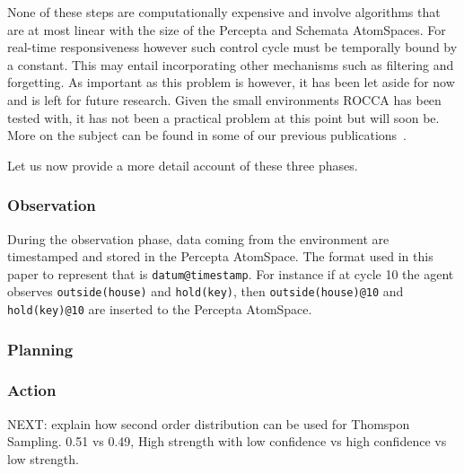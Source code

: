 \documentclass[runningheads]{llncs}
\begin{document}
None of these steps are computationally expensive and involve
algorithms that are at most linear with the size of the Percepta and
Schemata AtomSpaces.  For real-time responsiveness however such
control cycle must be temporally bound by a constant.  This may entail
incorporating other mechanisms such as filtering and forgetting.  As
important as this problem is however, it has been let aside for now
and is left for future research.  Given the small environments ROCCA
has been tested with, it has not been a practical problem at this
point but will soon be.  More on the subject can be found in some of
our previous publications~\cite{TODO: EAI}.

Let us now provide a more detail account of these three phases.

\subsubsection{Observation}
During the observation phase, data coming from the environment are
timestamped and stored in the Percepta AtomSpace.  The format used in
this paper to represent that is \texttt{datum@timestamp}.  For
instance if at cycle 10 the agent observes
\texttt{outside(house)} and
\texttt{hold(key)}, then \texttt{outside(house)@10} and
\texttt{hold(key)@10}
are inserted to the Percepta AtomSpace.

\subsubsection{Planning}



\subsubsection{Action}

NEXT: explain how second order distribution can be used for Thomspon
Sampling.  0.51 vs 0.49, High strength with low confidence vs high
confidence vs low strength.
\end{document}

